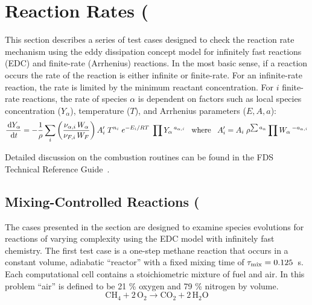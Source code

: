 \documentclass[11pt]{book}
\begin{document}
\clearpage

\section{Reaction Rates (\texorpdfstring{})}

This section describes a series of test cases designed to check the reaction rate mechanism using the eddy dissipation concept model for infinitely fast reactions (EDC) and  finite-rate (Arrhenius) reactions. In the most basic sense, if a reaction occurs the rate of the reaction is either infinite or finite-rate. For an infinite-rate reaction, the rate is limited by the minimum reactant concentration. For $i$ finite-rate reactions, the rate of species $\alpha$ is dependent on factors such as local species concentration ($Y_{\alpha}$), temperature ($T$), and Arrhenius parameters ($E,A,a$):
\begin{equation}\label{eq:finite_rate1}
\frac{\,\mathrm{d} Y_{\alpha}}{\,\mathrm{d} t} = -\frac{1}{\rho}\sum_{i} \left(\frac{\nu_{\alpha,i}\,W_{\alpha}}{\nu_{F,i}\,W_{F}}\right)A_i^{\prime}\;T^{n_i}\;e^{-E_i/RT}\;\prod Y_{\alpha}\,^{a_{\alpha,i}} \;\;\; \text{where} \;\;\; A^{\prime}_{i} = A_{i}\;\rho^{\sum a_{\alpha}}\prod W_{\alpha}\,^{-a_{\alpha,i}}
\end{equation}

Detailed discussion on the combustion routines can be found in the FDS Technical Reference Guide~\cite{FDS_Tech_Guide}.

\subsection{Mixing-Controlled Reactions (\texorpdfstring{})}

The cases presented in the section are designed to examine species evolutions for reactions of varying complexity using the EDC model with infinitely fast chemistry. The first test case is a one-step methane reaction that occurs in a constant volume, adiabatic ``reactor'' with a fixed mixing time of $\tau_{\rm mix}=0.125$~s. Each computational cell contains a stoichiometric mixture of fuel and air. In this problem ``air'' is defined to be 21 \% oxygen and 79 \% nitrogen by volume.
\begin{equation}\label{eq:1step_methane}
\mathrm{CH_4 + 2\, O_2 \rightarrow  CO_2 + 2\, H_2O}
\end{equation}
\end{document}
